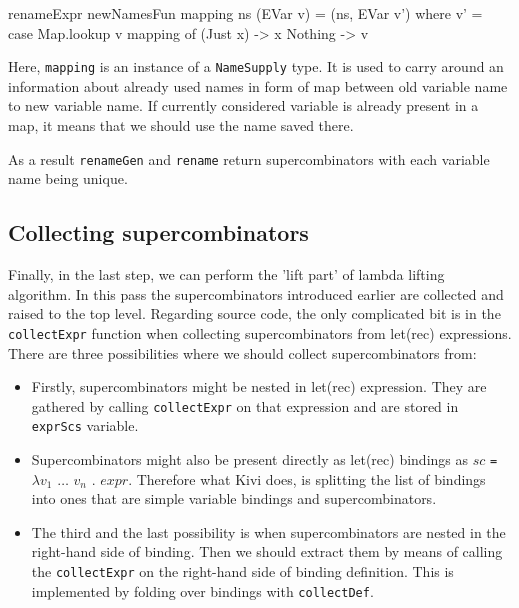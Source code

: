 \documentclass[12pt,a4paper]{report}
\begin{document}
\vspace*{0.2in}
\begin{code}[style=haskell]
renameExpr newNamesFun mapping ns (EVar v) =
    (ns, EVar v')
    where
        v' = case Map.lookup v mapping of
            (Just x) -> x
            Nothing -> v
\end{code}

Here, \texttt{mapping} is an instance of a \texttt{NameSupply} type. It is used
to carry around an information about already used names in form of map between
old variable name to new variable name. If currently considered variable is
already present in a map, it means that we should use the name saved there.

As a result \texttt{renameGen} and \texttt{rename} return supercombinators with
each variable name being unique.

\subsection{Collecting supercombinators}
Finally, in the last step, we can perform the 'lift part' of lambda lifting
algorithm. In this pass the supercombinators introduced earlier are collected
and raised to the top level.  Regarding source code, the only complicated bit
is in the \texttt{collectExpr} function when collecting supercombinators from
let(rec) expressions.  There are three possibilities where we should
collect supercombinators from:

\begin{itemize}
  \item Firstly, supercombinators might be nested in let(rec)
    expression. They are gathered by calling \texttt{collectExpr} on that
    expression and are stored in \texttt{exprScs} variable.
  \item Supercombinators might also be present directly as let(rec)
    bindings as $sc$ \texttt{=} $\lambda v_1$ $\ldots$ $v_n$ . $expr$.
    Therefore what Kivi does, is splitting the list of bindings into ones that
    are simple variable bindings and supercombinators.
  \item The third and the last possibility is when supercombinators are nested
    in the right-hand side of binding. Then we should extract them by means of
    calling the \texttt{collectExpr} on the right-hand side of binding
    definition. This is implemented by folding over bindings with
    \texttt{collectDef}.
\end{itemize}
\end{document}
